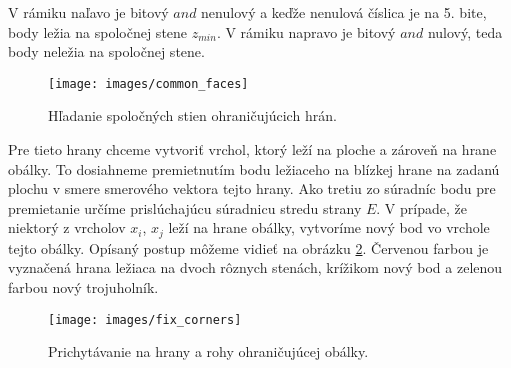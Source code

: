 \begin{itemize}
{                V rámiku naľavo je bitový $and$ nenulový a keďže nenulová číslica je na 5. bite, body ležia
                na spoločnej stene $z_{min}$. V rámiku napravo je bitový $and$ nulový, teda body neležia
                na spoločnej stene.

                \begin{figure}
                    \centerline{\texttt{[image: images/common\_faces]}}
                    \caption[Hľadanie spoločných stien ohraničujúcich hrán]
                    {Hľadanie spoločných stien ohraničujúcich hrán.}
                    \label{obr:common_faces}
                \end{figure}

                Pre tieto hrany chceme vytvoriť vrchol, ktorý leží na ploche a zároveň na hrane obálky.
                To dosiahneme premietnutím bodu ležiaceho na blízkej hrane na zadanú plochu v smere 
                smerového vektora tejto hrany. Ako tretiu zo súradníc bodu pre premietanie určíme 
                prislúchajúcu súradnicu stredu strany $E$. V prípade, že niektorý z vrcholov 
                $x_i$, $x_j$ leží na hrane obálky, vytvoríme nový bod vo vrchole tejto obálky. 
                Opísaný postup môžeme vidieť na obrázku \ref{obr:fix_corners}. Červenou farbou 
                je vyznačená hrana ležiaca na dvoch rôznych stenách, krížikom nový bod a zelenou farbou
                nový trojuholník.
                
                
                \begin{figure}
                    \centerline{\texttt{[image: images/fix\_corners]}}
                    \caption[Prichytávanie na hrany a rohy ohraničujúcej obálky]
                    {Prichytávanie na hrany a rohy ohraničujúcej obálky.}
                    \label{obr:fix_corners}
                \end{figure}

    }
\end{itemize}